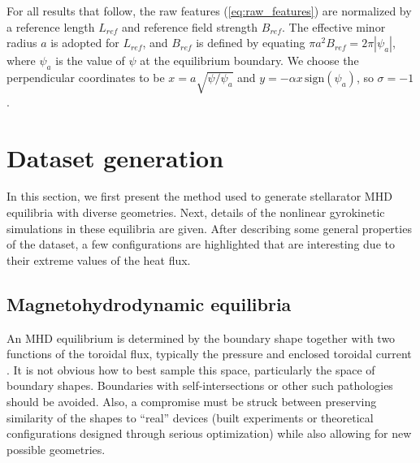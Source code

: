 \documentclass{jpp}
\begin{document}
For all results that follow, the raw features (\ref{eq:raw_features}) are normalized by a reference length $L_{ref}$ and reference field strength $B_{ref}$.
The effective minor radius $a$ is adopted for $L_{ref}$, and $B_{ref}$ is defined by equating $\pi a^2 B_{ref} = 2\pi|\psi_a|$, where $\psi_a$ is the value of $\psi$ at the equilibrium boundary.
We choose the perpendicular coordinates to be $x=a\sqrt{\psi/\psi_a}$ and $y=-\alpha x \, \mathrm{sign}(\psi_a)$, so $\sigma=-1$.



\section{Dataset generation}
\label{sec:data_generation}

In this section, we first present the method used to generate stellarator MHD equilibria with diverse geometries.
Next, details of the nonlinear gyrokinetic simulations in these equilibria are given.
After describing some general properties of the dataset, a few configurations are highlighted that are interesting due to their extreme values of the heat flux.


\subsection{Magnetohydrodynamic equilibria}
\label{sec:equilibrium_generation}

An MHD equilibrium is determined by the boundary shape together with two functions of the toroidal flux, typically the pressure and enclosed toroidal current \citep{kruskal1958equilibrium}.
It is not obvious how to best sample this space, particularly the space of boundary shapes.
Boundaries with self-intersections or other such pathologies should be avoided.
Also, a compromise must be struck between preserving similarity of the shapes to ``real'' devices (built experiments or theoretical configurations designed through serious optimization) while also allowing for new possible geometries.
\end{document}
